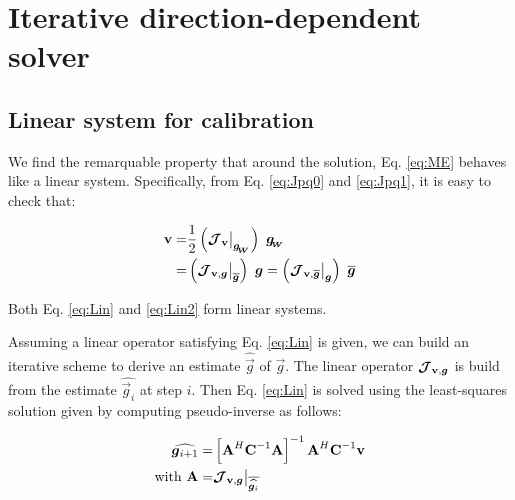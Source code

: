 \section{Iterative direction-dependent solver}
\label{sec:Solver}

\subsection{Linear system for calibration}


We find
the remarquable property that around the solution, Eq. \ref{eq:ME}
behaves like a linear system. Specifically, from Eq. \ref{eq:Jpq0} and
\ref{eq:Jpq1}, it is easy to check that:


\begin{alignat}{2}
\label{eq:Lin}
\vis=&\frac{1}{2}\left(\JV\big|_{\gwirt}\right)\ \gwirt\\
\label{eq:Lin2}
=&\left(\JVg\big|_{\conj{\g}}\right)\ \g=\left(\JVCg\big|_{\g}\right)\ \conj{\g}
\end{alignat}



Both Eq. \ref{eq:Lin} and \ref{eq:Lin2} form linear systems.

\separator

Assuming a linear operator satisfying
Eq. \ref{eq:Lin} is given, we can build an iterative scheme to
derive an estimate $\widehat{\vec{g}}$ of $\vec{g}$. The linear operator
$\bm{\mathcal{J}}_{\textbf{v},\bm{g}}$ is build from the estimate
$\widehat{\vec{g}_i}$ at step $i$. Then Eq. \ref{eq:Lin} is solved
using the least-squares solution given by computing pseudo-inverse as follows:

\def\A{\textbf{A}}

\begin{alignat}{2}
\label{eq:Solve}
\widehat{\vec{g}_{i+1}}=&\left[\A^H\textbf{C}^{-1}\A\right]^{-1}\A^H\textbf{C}^{-1}\mathbf{v}\\
\label{eq:SolveA}
\text{with } \A=&\JVg\big|_{\conj{\widehat{\g_i}}}
\end{alignat}

